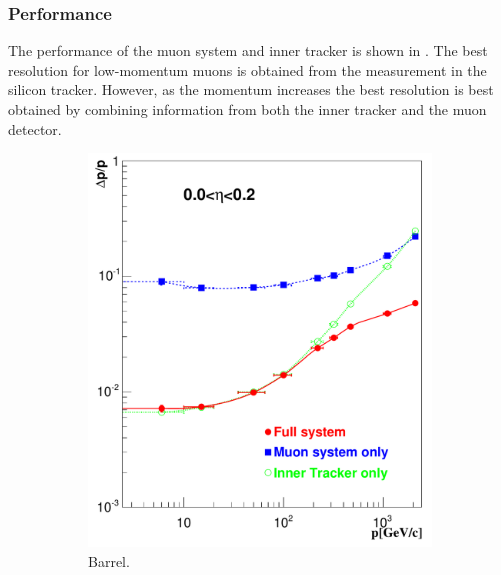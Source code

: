\subsubsection{Performance}
The performance of the muon system and inner tracker is shown in 
. The best resolution for low-momentum muons
is obtained from the measurement in the silicon tracker. However, as the momentum
increases the best resolution is best obtained by combining information
from both the inner tracker and the muon detector.

\begin{figure}[htbp]
  \centering
  \begin{subfigure}{0.48\textwidth}
    \centering
    \includegraphics[width=\textwidth]{muon_barrel}
    \caption{Barrel.}
    \label{fig:muon_barrel}
  \end{subfigure}
  \begin{subfigure}{0.48\textwidth}
    \centering

\end{subfigure}
\end{figure}
